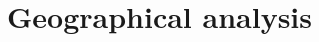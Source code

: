 \section{Geographical analysis}\label{sec:geographical-analysis}

\newpage

\newpage

\newpage
% 
% 


